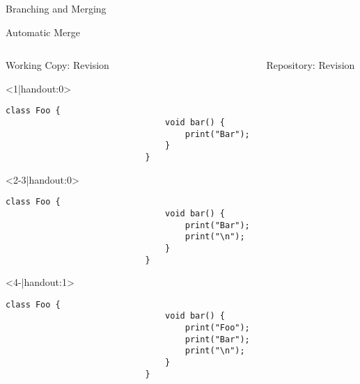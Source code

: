 
\slideMergePull{}

\slideIgnore{}

\begin{frame}{Branching and Merging} %
	\slideBranchingAndMerging{}
\end{frame}

\begin{frame}[fragile]{Automatic Merge} %
	\begin{columns}[onlytextwidth]
		\begin{column}{0.6\linewidth}
			\begin{columns}[T]
				\begin{column}{0.5\linewidth}
					Working Copy: Revision \only<4>{\emph{11$^*$}}\\[2mm]
					
					\begin{onlyenv}<1|handout:0>
						\begin{lstlisting}[style=java,basicstyle=\fontfamily{pcr}\small\selectfont,numbers=none,escapechar=|]
							class Foo {
								void bar() {
									print("Bar");
								}
							}	
						\end{lstlisting}
					\end{onlyenv}
					\begin{onlyenv}
						\begin{lstlisting}[style=java,basicstyle=\fontfamily{pcr}\small\selectfont,numbers=none,escapechar=|]
							class Foo {
								void bar() {
									print("Bar");
									print("\n");
								}
							}	
						\end{lstlisting}
					\end{onlyenv}
					\begin{onlyenv}
						\begin{lstlisting}[style=java,basicstyle=\fontfamily{pcr}\small\selectfont,numbers=none,escapechar=|]
							class Foo {
								void bar() {
									print("Foo");
									print("Bar");
									print("\n");
								}
							}	
						\end{lstlisting}
					\end{onlyenv}
				\end{column}
				\begin{column}{0.5\linewidth}					
					Repository: Revision \only<3->{\emph{11}}
					

\end{column}
\end{columns}
\end{column}
\end{columns}
\end{frame}
